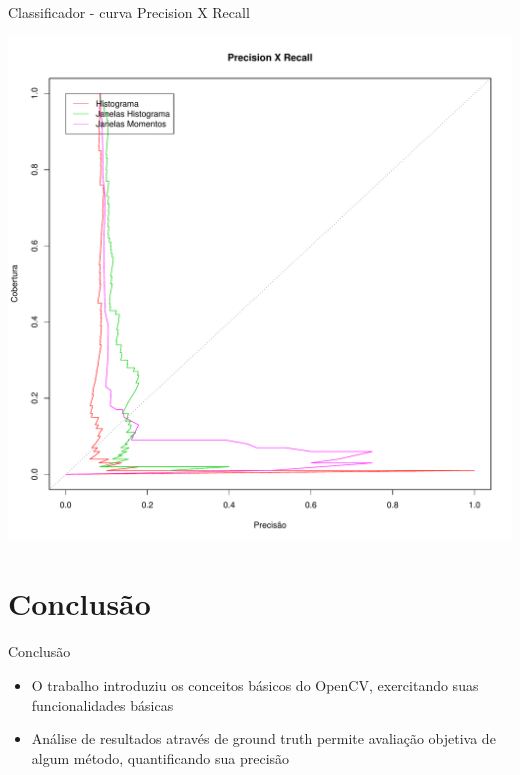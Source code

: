 \documentclass[
    style=paintings,
    paper=screen,
    blackslide,
    nopagebreaks,
    fleqn
]{powerdot}
\begin{document}
\begin{slide}{Classificador - curva Precision X Recall}
\begin{center} 
\includegraphics[width=0.65\linewidth]{img/precision_recall}
\end{center}
\end{slide}


\section[slide=false]{Conclusão}
\begin{slide}{Conclusão}
\begin{itemize}[type=1]
\item <1-> O trabalho introduziu os conceitos básicos do OpenCV, exercitando suas funcionalidades básicas
\item <2-> Análise de resultados através de ground truth permite avaliação objetiva de algum método, quantificando sua precisão
\end{itemize}
\end{slide}

%
%
\end{document}
